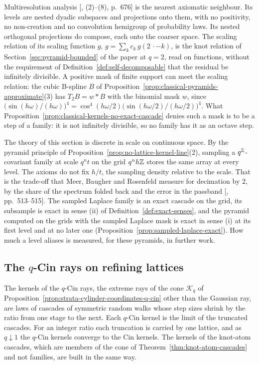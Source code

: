 Multiresolution analysis [, (2)--(8), p.~676] is the nearest axiomatic
neighbour. Its levels are nested dyadic subspaces and projections onto them, with no positivity, no
non-creation and no convolution hemigroup of probability laws. Its nested orthogonal projections do
compose, each onto the coarser space. The scaling relation of its scaling function $g$, $g = \sum_kc_k\,g(2\,\cdot - k)$, is
the knot relation of Section~\ref{sec:pyramid-bounded} of the paper at $q = 2$, read on functions,
without the requirement of Definition~\ref{def:self-decomposable} that the residual be infinitely
divisible. A positive mask of finite support can meet the scaling relation:
the cubic B-spline $B$ of Proposition~\ref{prop:classical-pyramids-approximate}(3) has
$T_2B = w * B$ with the binomial mask $w$, since
$\bigl(\sin(h\omega)/(h\omega)\bigr)^4 = \cos^4(h\omega/2)\bigl(\sin(h\omega/2)/(h\omega/2)\bigr)^4$.
What Proposition~\ref{prop:classical-kernels-no-exact-cascade} denies such a mask is to be a step
of a family: it is not infinitely divisible, so no family has it as an octave step.

The theory of this section is discrete in scale on continuous space. By the pyramid principle of
Proposition~\ref{prop:no-lattice-kernel-line}(2), sampling a $q^{\mathbb{Z}}$-covariant family at scale
$q^nt$ on the grid $q^nh\mathbb{Z}$ stores the same array at every level. The axioms do not fix $h/t$, the
sampling density relative to the scale. That is the trade-off that Meer, Baugher and Rosenfeld
measure for decimation by $2$, by the share of the spectrum folded back and the error in the
passband [, pp.~513--515]. The sampled Laplace family is an exact
cascade on the grid, its subsample is exact in sense (ii) of Definition~\ref{def:exact-senses}, and
the \Matern{} pyramid computed on the grids with the sampled Laplace mask is exact in sense (i) at
its first level and at no later one (Proposition~\ref{prop:sampled-laplace-exact}). How much a level aliases
is measured, for these pyramids, in further work.

\subsection{The $q$-Cin rays on refining lattices}
\label{sec:line-random-walks}

The kernels of the $q$-Cin rays, the extreme rays of the cone $\mathcal{K}_q$ of
Proposition~\ref{prop:strata-cylinder-coordinates-q-cin} other than the Gaussian ray, are laws of cascades of symmetric random
walks whose step sizes shrink by the ratio from one stage to the next. Each $q$-Cin kernel is the
limit of the truncated cascades. For an integer ratio each truncation is carried by one lattice, and
as $q \downarrow 1$ the $q$-Cin kernels converge to the Cin kernels. The kernels of the knot-atom
cascades, which are members of the cone of Theorem~\ref{thm:knot-atom-cascades} and not families,
are built in the same way.

